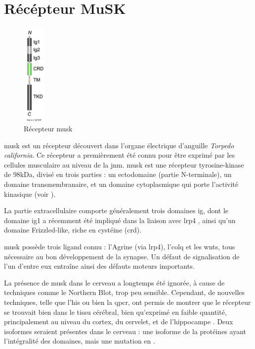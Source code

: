 \section{Récépteur MuSK}
	\label{sec:IntroMuSK}
	
	\begin{figure}
		\includegraphics[width=0.1\textwidth]{./Images/MuSKReceptor.png}	
		\caption{Récepteur \gls{musk}}
		\label{fig:RMuSK}
	\end{figure}

	\gls{musk} est un récepteur découvert dans l'organe électrique d'anguille \emph{Torpedo california}. Ce récepteur a premièrement été connu pour être exprimé par les cellules musculaire au niveau de la \gls{jnm}. \gls{musk} est une récepteur tyrosine-kinase de 98kDa, divisé en trois parties : un ectodomaine (partie N-terminale), un domaine transmembranaire, et un domaine cytoplasmique qui porte l'activité kinasique (voir ). 
	
	La partie extracellulaire comporte généralement trois domaines \gls{ig}, dont le domaine \gls{ig}1 a récemment été impliqué dans la liaison avec \gls{lrp4} \cite{Zhang2011}, ainsi qu'un domaine Frizzled-like, riche en cystéine (\gls{crd}).
	
	\gls{musk} possède trois ligand connu : l'Agrine (via \gls{lrp4}), l'\gls{colq} et les \Glspl{wnt}, tous nécessaire au bon développement de la synapse. Un défaut de signalisation de l'un d'entre eux entraîne ainsi des défauts moteurs importants.
	
	La présence de \gls{musk} dans le cerveau a longtemps été ignorée, à cause de techniques comme le Northern Blot, trop peu sensible. Cependant, de nouvelles techniques, telle que l'\gls{his} ou bien la \gls{qpcr}, ont permis de montrer que le récepteur se trouvait bien dans le tissu cérébral, bien qu'exprimé en faible quantité, principalement au niveau du cortex, du cervelet, et de l'hippocampe \cite{Garcia-Osta2006, Ksiazek2007}. Deux isoformes seraient présentes dans le cerveau : une isoforme de la protéines ayant l'intégralité des domaines, mais une mutation en .
	
